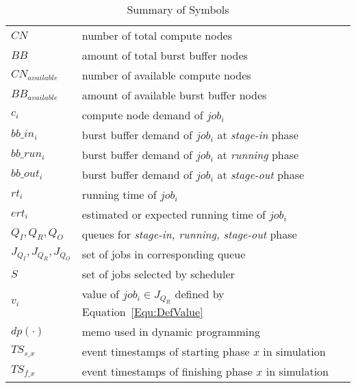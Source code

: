 \begin{table}[!htbp] 
        \renewcommand{\arraystretch}{1.3}
        \caption{Summary of Symbols}
        \label{Tab:Symbols}
        \centering
        \begin{tabular}{l|l}
                \hline
                $CN$ & number of total compute nodes \\
                $BB$ & amount of total burst buffer nodes \\
                $CN_{available}$ & number of available compute nodes \\
                $BB_{available}$ & amount of available burst buffer nodes \\
                $c_i$ & compute node demand of $job_i$ \\
                $bb\_in_i$ & burst buffer demand of $job_i$ at \textit{stage-in} phase \\
                $bb\_run_i$ & burst buffer demand of $job_i$ at \textit{running} phase \\
                $bb\_out_i$ & burst buffer demand of $job_i$ at \textit{stage-out} phase \\
                $rt_i$ & running time of $job_i$ \\
                $ert_i$ & estimated or expected running time of $job_i$ \\
                $Q_I, Q_R, Q_O$ & queues for \textit{stage-in, running, stage-out} phase \\
                $J_{Q_I}, J_{Q_R}, J_{Q_O}$ & set of jobs in corresponding queue \\
                $S$ & set of jobs selected by scheduler \\
                $v_i$ & value of $job_i \in J_{Q_R}$ defined by Equation~\ref{Equ:DefValue}\\
                $dp(\cdot)$ & memo used in dynamic programming \\
                $TS_{s\_x}$ & event timestamps of starting phase $x$ in simulation \\
                $TS_{f\_x}$ & event timestamps of finishing phase $x$ in simulation \\
                \hline
        \end{tabular}
\end{table}



